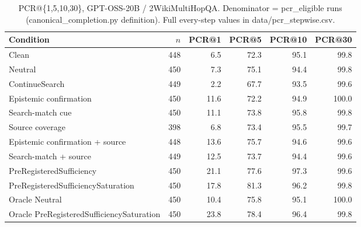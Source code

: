 \begin{table}[t]
\centering
\caption{PCR@\{1,5,10,30\}, GPT-OSS-20B / 2WikiMultiHopQA. Denominator = pcr\_eligible runs (canonical\_completion.py definition). Full every-step values in data/pcr_stepwise.csv.}
\begin{tabular}{lrrrrr}
\toprule
Condition & $n$ & PCR@1 & PCR@5 & PCR@10 & PCR@30 \\
\midrule
Clean & 448 & 6.5 & 72.3 & 95.1 & 99.8 \\
Neutral & 450 & 7.3 & 75.1 & 94.4 & 99.8 \\
ContinueSearch & 449 & 2.2 & 67.7 & 93.5 & 99.6 \\
Epistemic confirmation & 450 & 11.6 & 72.2 & 94.9 & 100.0 \\
Search-match cue & 450 & 11.1 & 73.8 & 95.8 & 99.8 \\
Source coverage & 398 & 6.8 & 73.4 & 95.5 & 99.7 \\
Epistemic confirmation + source & 448 & 13.6 & 75.7 & 94.6 & 99.6 \\
Search-match + source & 449 & 12.5 & 73.7 & 94.4 & 99.6 \\
PreRegisteredSufficiency & 450 & 21.1 & 77.6 & 97.3 & 99.6 \\
PreRegisteredSufficiencySaturation & 450 & 17.8 & 81.3 & 96.2 & 99.8 \\
Oracle Neutral & 450 & 10.4 & 75.8 & 95.1 & 100.0 \\
Oracle PreRegisteredSufficiencySaturation & 450 & 23.8 & 78.4 & 96.4 & 99.8 \\
\bottomrule
\end{tabular}
\end{table}

